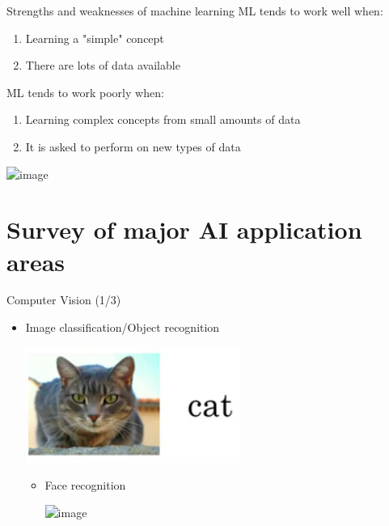 \documentclass[pdf]{beamer}
\theoremstyle{mystyle}
\begin{document}
\begin{frame}{Strengths and weaknesses of machine learning}
	ML tends to work well when:
	\begin{enumerate}
		\item<2-> Learning a "simple" concept 
		\item<3-> There are lots of data available
	\end{enumerate}
	
	\bigskip	
	
	ML tends to work poorly when:
	\begin{enumerate}
		\item<4-> Learning complex concepts from small amounts of data
		\item<5-> It is asked to perform on new types of data
	\end{enumerate}
	\begin{center}
		\includegraphics<5->[scale=.275]{new-types-of-data}
	\end{center}
\end{frame}
	

\section{Survey of major AI application areas}
\begin{frame}{Computer Vision (1/3)}
	\begin{itemize}
		\item Image classification/Object recognition 
		\begin{center}
			\includegraphics[scale=.4]{image-classification}	
		\end{center}
		\begin{itemize}
			\item<2-> Face recognition
			\begin{center}
				\includegraphics<2->[scale=.35]{face-recognition}
			\end{center}
		\end{itemize}
	\end{itemize}
\end{frame}
\end{document}
